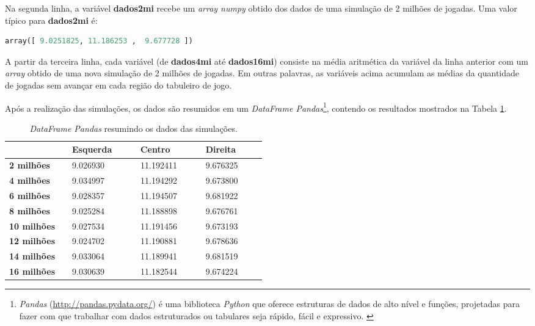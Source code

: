 \documentclass[12pt]{article}
\begin{document}
Na segunda linha, a variável \textbf{dados2mi} recebe um \textit{array numpy} obtido dos dados de uma simulação de 2 milhões de jogadas. Uma valor típico para \textbf{dados2mi} é:

\begin{lstlisting}[language=Python]
array([ 9.0251825, 11.186253 ,  9.677728 ])
\end{lstlisting}


A partir da terceira linha, cada variável (de \textbf{dados4mi} até \textbf{dados16mi}) consiste na média aritmética da variável da linha anterior com um \textit{array} obtido de uma nova simulação de 2 milhões de jogadas. Em outras palavras, as variáveis acima acumulam as médias da quantidade de jogadas sem avançar em cada região do tabuleiro de jogo.

Após a realização das simulações, os dados são resumidos em um \textit{DataFrame Pandas}\footnote{\textit{Pandas} (\url{http://pandas.pydata.org/}) é uma biblioteca \textit{Python} que oferece estruturas de dados de alto nível e funções, projetadas para fazer com que trabalhar com dados estruturados ou tabulares seja rápido, fácil e expressivo. \cite{mckinney:2018}}, contendo os resultados mostrados na Tabela \ref{tab_data_frame}.


\begin{table}[ht!]
	\centering
	\caption{\textit{DataFrame Pandas} resumindo os dados das simulações.}
	\label{tab_data_frame}
	\begin{tabular}{|m{0.13\linewidth}|m{0.12\linewidth}|m{0.12\linewidth}|m{0.12\linewidth}|}
		\hline
		& \textbf{Esquerda} & \textbf{Centro} & \textbf{Direita}\\		
		\hline
		\hline
		\textbf{2 milhões} &	9.026930 &	11.192411 &	9.676325\\
		\hline
		\textbf{4 milhões} &	9.034997 &	11.194292 &	9.673800\\
		\hline
		\textbf{6 milhões} &	9.028357 &	11.194507 &	9.681922\\
		\hline
		\textbf{8 milhões} &	9.025284 &	11.188898 &	9.676761\\
		\hline
		\textbf{10 milhões} 	&9.027534 	&11.191456 	&9.673193\\
		\hline
		\textbf{12 milhões} 	&9.024702 	&11.190881 	&9.678636\\
		\hline
		\textbf{14 milhões} 	&9.033064 	&11.189941 	&9.681519\\
		\hline
		\textbf{16 milhões} 	&9.030639 	&11.182544 	&9.674224\\
		\hline
	\end{tabular}
\end{table}
\end{document}
